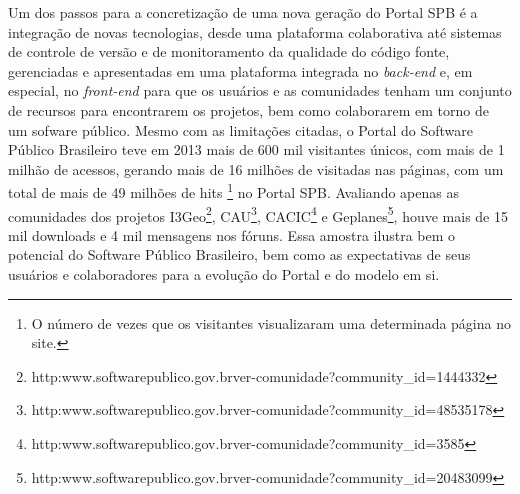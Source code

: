 Um dos passos para a concretização de uma nova geração do Portal SPB é a
integração de novas tecnologias, desde uma plataforma colaborativa até sistemas
de controle de versão e de monitoramento da qualidade do código fonte,
gerenciadas e apresentadas em uma plataforma integrada no {\it back-end} e, em especial,
no {\it front-end} para que os usuários e as comunidades tenham um conjunto de
recursos para encontrarem os projetos, bem como colaborarem em torno de um
sofware público.
%
Mesmo com as limitações citadas, o Portal do Software Público Brasileiro teve
em 2013 mais de 600 mil visitantes únicos, com mais de 1 milhão de acessos,
gerando mais de 16 milhões de visitadas nas páginas, com um total de mais de 49
milhões de hits \footnote{O número de vezes que os visitantes visualizaram uma
determinada página no site.} no Portal SPB.
%
Avaliando apenas as comunidades dos projetos I3Geo\footnote{http:\/\/www.softwarepublico.gov.br\/ver-comunidade?community\_id=1444332}, CAU\footnote{http:\/\/www.softwarepublico.gov.br\/ver-comunidade?community\_id=48535178}, CACIC\footnote{http:\/\/www.softwarepublico.gov.br\/ver-comunidade?community\_id=3585} e Geplanes\footnote{http:\/\/www.softwarepublico.gov.br\/ver-comunidade?community\_id=20483099}, houve
mais de 15 mil downloads e 4 mil mensagens nos fóruns.
%
Essa amostra ilustra bem o potencial do Software Público Brasileiro, bem como
as expectativas de seus usuários e colaboradores para a evolução do Portal e
do modelo em si.


